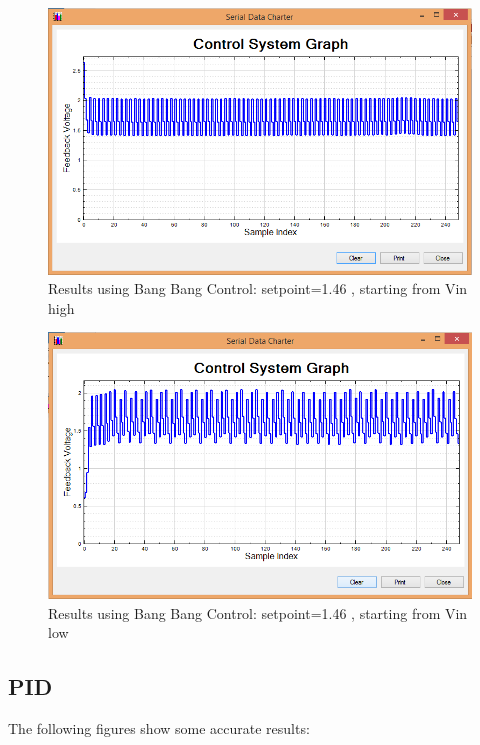 \documentclass[11pt]{article}
\begin{document}
	\begin{figure}[H]\centering
	\includegraphics[height=0.7\textwidth]{images/BBh146.png}
	\caption{Results using Bang Bang Control: setpoint=1.46 , starting from Vin high}
		\label{bang_bang_h}
	\end{figure}
	
	\begin{figure}[H]\centering
	\includegraphics[height=0.7\textwidth]{images/BBl146.png}
	\caption{Results using Bang Bang Control: setpoint=1.46 , starting from Vin low}
		\label{bang_bang_l}
	\end{figure}

	
\subsection{PID}
The following figures show some accurate results:
\end{document}
